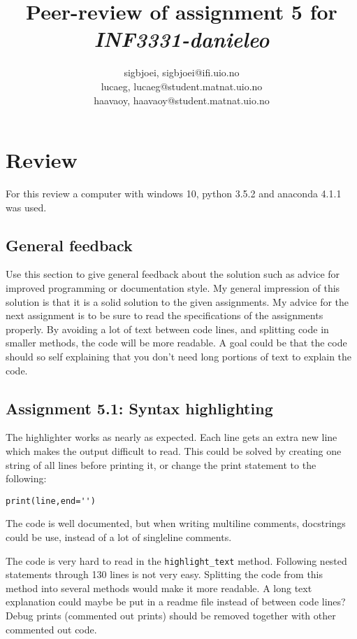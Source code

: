 \documentclass[a4paper]{article}
\title{Peer-review of assignment 5 for \textit{INF3331-danieleo}}
\author{sigbjoei, {sigbjoei@ifi.uio.no} \\
 		lucaeg, {lucaeg@student.matnat.uio.no} \\
		haavaoy, {haavaoy@student.matnat.uio.no}}
\begin{document}
\maketitle



\section{Review}
For this review a computer with windows 10, python 3.5.2 and anaconda 4.1.1 was used.

\subsection*{General feedback}
Use this section to give general feedback about the solution such as advice for improved programming or documentation style.
My general impression of this solution is that it is a solid solution to the given assignments. My advice for the next assignment is to be sure to read the specifications of the assignments properly. By avoiding a lot of text between code lines, and splitting code in smaller methods, the code will be more readable. A goal could be that the code should so self explaining that you don't need long portions of text to explain the code.

\subsection*{Assignment 5.1: Syntax highlighting}
The highlighter works as nearly as expected. Each line gets an extra new line which makes the output difficult to read. This could be solved by creating one string of all lines before printing it, or change the print statement to the following: 
\begin{lstlisting}
print(line,end='')
\end{lstlisting}

The code is well documented, but when writing multiline comments, docstrings could be use, instead of a lot of singleline comments. 

The code is very hard to read in the \verb|highlight_text| method. Following nested statements through 130 lines is not very easy. Splitting the code from this method into several methods would make it more readable. A long text explanation could maybe be put in a readme file instead of between code lines? Debug prints (commented out prints) should be removed together with other commented out code. 
\end{document}
